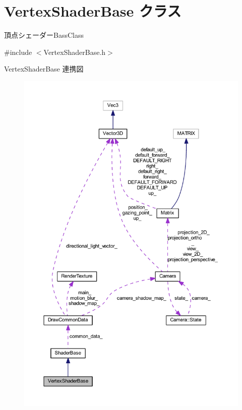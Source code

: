 \hypertarget{class_vertex_shader_base}{}\section{Vertex\+Shader\+Base クラス}
\label{class_vertex_shader_base}


頂点シェーダー\+Bass\+Class  




{\ttfamily \#include $<$Vertex\+Shader\+Base.\+h$>$}



Vertex\+Shader\+Base 連携図\nopagebreak
\begin{figure}[H]
\begin{center}
\leavevmode
\includegraphics[width=350pt]{class_vertex_shader_base__coll__graph}
\end{center}
\end{figure}
